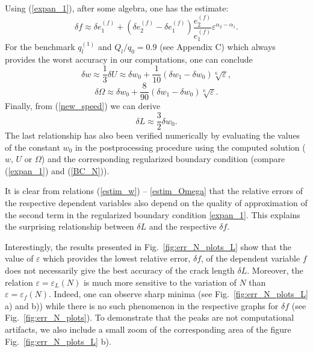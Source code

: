 Using (\ref{expan_1}), after some algebra, one has the estimate:
\begin{equation}
\label{estim}
\delta f\approx\delta e_1^{(f)}+(\delta e_2^{(f)}-\delta e_1^{(f)})\frac{e_2^{(f)}}{e_1^{(f)}}\varepsilon^{\alpha_2-\alpha_1}.
\end{equation}
For the benchmark $q_l^{(1)}$ and $Q_l/q_0=0.9$ (see Appendix C) which always provides the worst accuracy in our computations, one can conclude
\begin{equation}
\label{estim_w}
\delta w\approx\frac{1}{3}\delta U\approx\delta w_0+\frac{1}{10}(\delta w_1-\delta w_0)\sqrt[6]{\varepsilon},
\end{equation}
 \begin{equation}
\label{estim_Omega}
\delta \Omega\approx\delta w_0+\frac{8}{90}(\delta w_1-\delta w_0)\sqrt[6]{\varepsilon}.
\end{equation}
Finally, from (\ref{new_speed}) we can derive
 \begin{equation}
\label{estim_L}
\delta L\approx\frac{3}{2}\delta w_0.
\end{equation}
The last relationship has also been verified numerically by evaluating the values of the constant $w_0$ in the postprocessing procedure
using the computed solution ($w$, $U$ or $\Omega$) and the corresponding regularized boundary condition (compare (\ref{expan_1}) and (\ref{BC_N})).

It is clear from relations (\ref{estim_w}) -- \eqref{estim_Omega} that the relative errors of the respective dependent variables
also depend on the quality of approximation of the second term  in the  regularized boundary condition \eqref{expan_1}.
This explains the surprising relationship between $\delta L$ and the respective $\delta f$.



Interestingly, the results presented in Fig.~\ref{fig:err_N_plots_L} show that the value of $\varepsilon$ which provides the lowest relative error, $\delta f$, of the dependent variable $f$
does not necessarily give the best accuracy of the crack length $\delta L$. Moreover, the relation $\varepsilon=\varepsilon_L(N)$ is much more sensitive to the variation of $N$ than  $\varepsilon=\varepsilon_f(N)$.
 Indeed, one can observe sharp minima (see Fig.~\ref{fig:err_N_plots_L} a) and b)) while there is no such phenomenon in the respective graphs for $\delta f$ (see Fig.~\ref{fig:err_N_plots}).
To demonstrate that the peaks are not computational artifacts, we also include a small zoom of the corresponding area of the figure Fig.~\ref{fig:err_N_plots_L} b).

